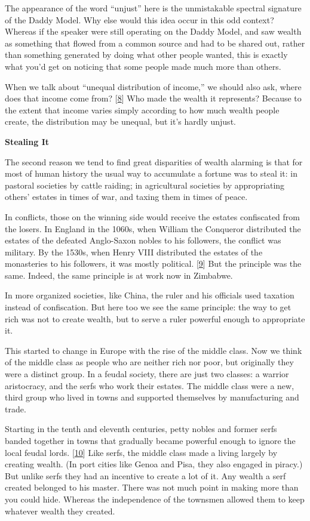 The appearance of the word ``unjust'' here is the unmistakable spectral
signature of the Daddy Model. Why else would this idea occur in this odd
context? Whereas if the speaker were still operating on the Daddy Model,
and saw wealth as something that flowed from a common source and had to
be shared out, rather than something generated by doing what other
people wanted, this is exactly what you'd get on noticing that some
people made much more than others.

When we talk about ``unequal distribution of income,'' we should also
ask, where does that income come from? {[}\hyperref[f8n]{8}{]} Who made
the wealth it represents? Because to the extent that income varies
simply according to how much wealth people create, the distribution may
be unequal, but it's hardly unjust.

\textbf{Stealing It}

The second reason we tend to find great disparities of wealth alarming
is that for most of human history the usual way to accumulate a fortune
was to steal it: in pastoral societies by cattle raiding; in
agricultural societies by appropriating others' estates in times of war,
and taxing them in times of peace.

In conflicts, those on the winning side would receive the estates
confiscated from the losers. In England in the 1060s, when William the
Conqueror distributed the estates of the defeated Anglo-Saxon nobles to
his followers, the conflict was military. By the 1530s, when Henry VIII
distributed the estates of the monasteries to his followers, it was
mostly political. {[}\hyperref[f9n]{9}{]} But the principle was the
same. Indeed, the same principle is at work now in Zimbabwe.

In more organized societies, like China, the ruler and his officials
used taxation instead of confiscation. But here too we see the same
principle: the way to get rich was not to create wealth, but to serve a
ruler powerful enough to appropriate it.

This started to change in Europe with the rise of the middle class. Now
we think of the middle class as people who are neither rich nor poor,
but originally they were a distinct group. In a feudal society, there
are just two classes: a warrior aristocracy, and the serfs who work
their estates. The middle class were a new, third group who lived in
towns and supported themselves by manufacturing and trade.

Starting in the tenth and eleventh centuries, petty nobles and former
serfs banded together in towns that gradually became powerful enough to
ignore the local feudal lords. {[}\hyperref[f10n]{10}{]} Like serfs, the
middle class made a living largely by creating wealth. (In port cities
like Genoa and Pisa, they also engaged in piracy.) But unlike serfs they
had an incentive to create a lot of it. Any wealth a serf created
belonged to his master. There was not much point in making more than you
could hide. Whereas the independence of the townsmen allowed them to
keep whatever wealth they created.

